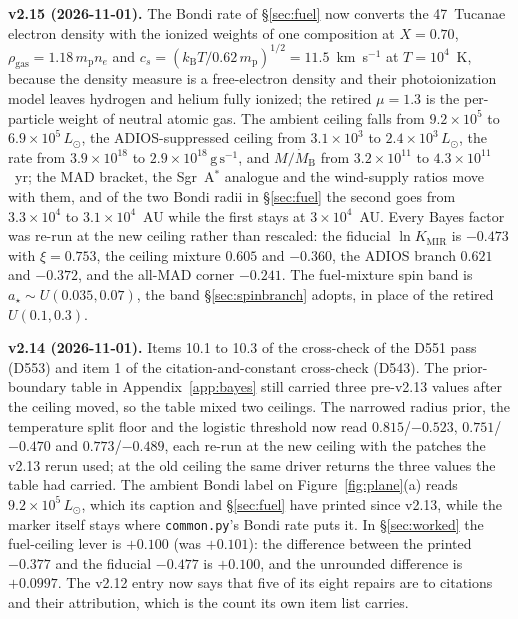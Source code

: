 \documentclass[11pt]{article}
\newcommand{\astar}{\ensuremath{a_\star}}
\newcommand{\lnK}{\ensuremath{\ln K}}
\begin{document}
\textbf{v2.15 (2026-11-01).} The Bondi rate of \S\ref{sec:fuel} now converts the 47~Tucanae electron density with the ionized weights of one composition at $X = 0.70$, $\rho_{\mathrm{gas}} = 1.18\,m_{\mathrm{p}}n_{e}$ and $c_{s} = (k_{\mathrm{B}}T/0.62\,m_{\mathrm{p}})^{1/2} = 11.5$~km~s$^{-1}$ at $T = 10^{4}$~K, because the density \citet{Abbate2018} measure is a free-electron density and their photoionization model leaves hydrogen and helium fully ionized; the retired $\mu = 1.3$ is the per-particle weight of neutral atomic gas. The ambient ceiling falls from $9.2\times10^{5}$ to $6.9\times10^{5}\,L_{\odot}$, the ADIOS-suppressed ceiling from $3.1\times10^{3}$ to $2.4\times10^{3}\,L_{\odot}$, the rate from $3.9\times10^{18}$ to $2.9\times10^{18}\,\mathrm{g\,s^{-1}}$, and $M/\dot{M}_{\mathrm{B}}$ from $3.2\times10^{11}$ to $4.3\times10^{11}$~yr; the MAD bracket, the Sgr~A$^{*}$ analogue and the wind-supply ratios move with them, and of the two Bondi radii in \S\ref{sec:fuel} the second goes from $3.3\times10^{4}$ to $3.1\times10^{4}$~AU while the first stays at $3\times10^{4}$~AU. Every Bayes factor was re-run at the new ceiling rather than rescaled: the fiducial $\lnK_{\mathrm{MIR}}$ is $-0.473$ with $\xi = 0.753$, the ceiling mixture $0.605$ and $-0.360$, the ADIOS branch $0.621$ and $-0.372$, and the all-MAD corner $-0.241$. The fuel-mixture spin band is $\astar \sim U(0.035, 0.07)$, the band \S\ref{sec:spinbranch} adopts, in place of the retired $U(0.1, 0.3)$.

\textbf{v2.14 (2026-11-01).} Items 10.1 to 10.3 of the cross-check of the D551 pass (D553) and item 1 of the citation-and-constant cross-check (D543). The prior-boundary table in Appendix~\ref{app:bayes} still carried three pre-v2.13 values after the ceiling moved, so the table mixed two ceilings. The narrowed radius prior, the temperature split floor and the logistic threshold now read $0.815$/$-0.523$, $0.751$/$-0.470$ and $0.773$/$-0.489$, each re-run at the new ceiling with the patches the v2.13 rerun used; at the old ceiling the same driver returns the three values the table had carried. The ambient Bondi label on Figure~\ref{fig:plane}(a) reads $9.2\times10^{5}\,L_{\odot}$, which its caption and \S\ref{sec:fuel} have printed since v2.13, while the marker itself stays where \texttt{common.py}'s Bondi rate puts it. In \S\ref{sec:worked} the fuel-ceiling lever is $+0.100$ (was $+0.101$): the difference between the printed $-0.377$ and the fiducial $-0.477$ is $+0.100$, and the unrounded difference is $+0.0997$. The v2.12 entry now says that five of its eight repairs are to citations and their attribution, which is the count its own item list carries.
\end{document}
